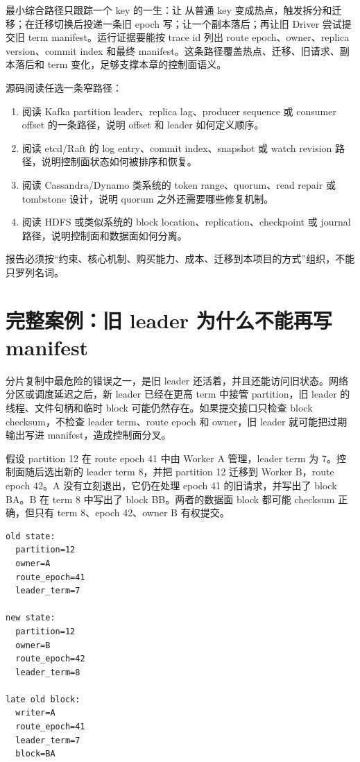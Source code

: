 最小综合路径只跟踪一个 key 的一生：让  从普通 key 变成热点，触发拆分和迁移；在迁移切换后投递一条旧 epoch 写；让一个副本落后；再让旧 Driver 尝试提交旧 term manifest。运行证据要能按 trace id 列出 route epoch、owner、replica version、commit index 和最终 manifest。这条路径覆盖热点、迁移、旧请求、副本落后和 term 变化，足够支撑本章的控制面语义。

\begin{sourcereadingbox}
源码阅读任选一条窄路径：
\begin{enumerate}
  \item 阅读 Kafka partition leader、replica lag、producer sequence 或 consumer offset 的一条路径，说明 offset 和 leader 如何定义顺序。
  \item 阅读 etcd/Raft 的 log entry、commit index、snapshot 或 watch revision 路径，说明控制面状态如何被排序和恢复。
  \item 阅读 Cassandra/Dynamo 类系统的 token range、quorum、read repair 或 tombstone 设计，说明 quorum 之外还需要哪些修复机制。
  \item 阅读 HDFS 或类似系统的 block location、replication、checkpoint 或 journal 路径，说明控制面和数据面如何分离。
\end{enumerate}
报告必须按“约束、核心机制、购买能力、成本、迁移到本项目的方式”组织，不能只罗列名词。
\end{sourcereadingbox}

\section{完整案例：旧 leader 为什么不能再写 manifest}

分片复制中最危险的错误之一，是旧 leader 还活着，并且还能访问旧状态。网络分区或调度延迟之后，新 leader 已经在更高 term 中接管 partition，旧 leader 的线程、文件句柄和临时 block 可能仍然存在。如果提交接口只检查 block checksum，不检查 leader term、route epoch 和 owner，旧 leader 就可能把过期输出写进 manifest，造成控制面分叉。

假设 partition 12 在 route epoch 41 中由 Worker A 管理，leader term 为 7。控制面随后选出新的 leader term 8，并把 partition 12 迁移到 Worker B，route epoch 42。A 没有立刻退出，它仍在处理 epoch 41 的旧请求，并写出了 block BA。B 在 term 8 中写出了 block BB。两者的数据面 block 都可能 checksum 正确，但只有 term 8、epoch 42、owner B 有权提交。

\begin{lstlisting}[numbers=none,caption={旧 leader 事故的事实表}]
old state:
  partition=12
  owner=A
  route_epoch=41
  leader_term=7

new state:
  partition=12
  owner=B
  route_epoch=42
  leader_term=8

late old block:
  writer=A
  route_epoch=41
  leader_term=7
  block=BA
\end{lstlisting}

